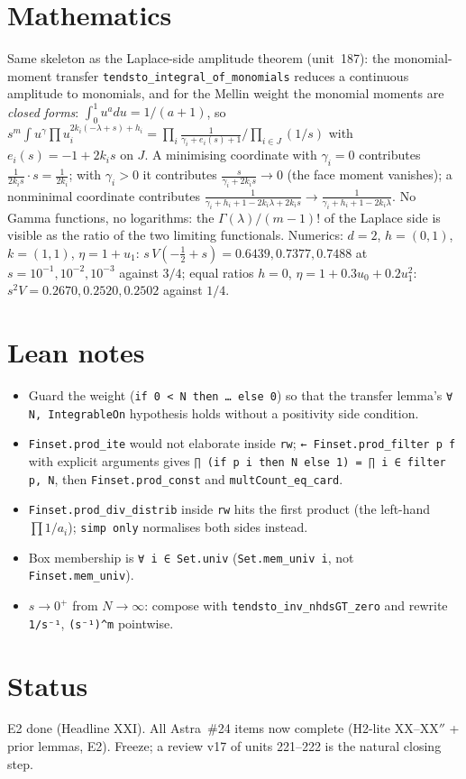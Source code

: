 \documentclass[11pt]{article}
\begin{document}
\section{Mathematics}
Same skeleton as the Laplace-side amplitude theorem (unit~187): the monomial-moment transfer
\texttt{tendsto\_integral\_of\_monomials} reduces a continuous amplitude to monomials, and for the
Mellin weight the monomial moments are \emph{closed forms}: $\int_0^1u^{a}du=1/(a+1)$, so
$s^m\int u^{\gamma}\prod u_i^{2k_i(-\lambda+s)+h_i}=\prod_i\frac{1}{\gamma_i+e_i(s)+1}\big/\prod_{i\in J}(1/s)$
with $e_i(s)=-1+2k_is$ on $J$. A minimising coordinate with $\gamma_i=0$ contributes
$\frac{1}{2k_is}\cdot s=\frac1{2k_i}$; with $\gamma_i>0$ it contributes $\frac{s}{\gamma_i+2k_is}\to0$
(the face moment vanishes); a nonminimal coordinate contributes $\frac1{\gamma_i+h_i+1-2k_i\lambda+2k_is}
\to\frac1{\gamma_i+h_i+1-2k_i\lambda}$. No Gamma functions, no logarithms: the $\Gamma(\lambda)/(m-1)!$
of the Laplace side is visible as the ratio of the two limiting functionals. Numerics: $d=2$, $h=(0,1)$,
$k=(1,1)$, $\eta=1+u_1$: $s\,V(-\tfrac12+s)=0.6439,0.7377,0.7488$ at $s=10^{-1},10^{-2},10^{-3}$
against $3/4$; equal ratios $h=0$, $\eta=1+0.3u_0+0.2u_1^2$: $s^2V=0.2670,0.2520,0.2502$ against $1/4$.

\section{Lean notes}
\begin{itemize}
\item Guard the weight (\texttt{if 0 < N then … else 0}) so that the transfer lemma's
  \texttt{∀ N, IntegrableOn} hypothesis holds without a positivity side condition.
\item \texttt{Finset.prod\_ite} would not elaborate inside \texttt{rw}; \texttt{← Finset.prod\_filter p f}
  with explicit arguments gives \texttt{∏ (if p i then N else 1) = ∏ i ∈ filter p, N}, then
  \texttt{Finset.prod\_const} and \texttt{multCount\_eq\_card}.
\item \texttt{Finset.prod\_div\_distrib} inside \texttt{rw} hits the first product (the left-hand
  $\prod 1/a_i$); \texttt{simp only} normalises both sides instead.
\item Box membership is \texttt{∀ i ∈ Set.univ} (\texttt{Set.mem\_univ i}, not \texttt{Finset.mem\_univ}).
\item $s\to0^+$ from $N\to\infty$: compose with \texttt{tendsto\_inv\_nhdsGT\_zero} and rewrite
  \texttt{1/s⁻¹}, \texttt{(s⁻¹)\^{}m} pointwise.
\end{itemize}

\section{Status}
E2 done (Headline XXI). All Astra~\#24 items now complete (H2-lite XX--XX$''$ + prior lemmas, E2).
Freeze; a review v17 of units 221--222 is the natural closing step.
\end{document}
